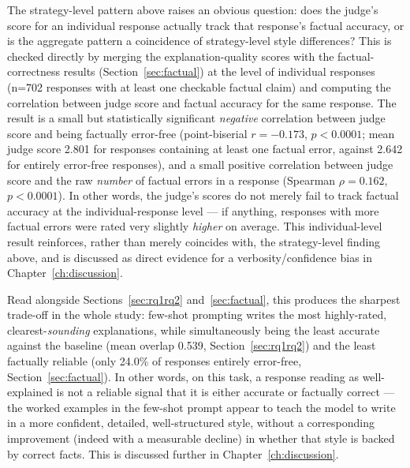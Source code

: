 The strategy-level pattern above raises an obvious question: does the judge's score for an individual response actually track that response's factual accuracy, or is the aggregate pattern a coincidence of strategy-level style differences? This is checked directly by merging the explanation-quality scores with the factual-correctness results (Section~\ref{sec:factual}) at the level of individual responses (n=702 responses with at least one checkable factual claim) and computing the correlation between judge score and factual accuracy for the same response. The result is a small but statistically significant \textit{negative} correlation between judge score and being factually error-free (point-biserial $r = -0.173$, $p < 0.0001$; mean judge score 2.801 for responses containing at least one factual error, against 2.642 for entirely error-free responses), and a small positive correlation between judge score and the raw \textit{number} of factual errors in a response (Spearman $\rho = 0.162$, $p < 0.0001$). In other words, the judge's scores do not merely fail to track factual accuracy at the individual-response level --- if anything, responses with more factual errors were rated very slightly \textit{higher} on average. This individual-level result reinforces, rather than merely coincides with, the strategy-level finding above, and is discussed as direct evidence for a verbosity/confidence bias in Chapter~\ref{ch:discussion}.

Read alongside Sections~\ref{sec:rq1rq2} and~\ref{sec:factual}, this produces the sharpest trade-off in the whole study: few-shot prompting writes the most highly-rated, clearest-\textit{sounding} explanations, while simultaneously being the least accurate against the baseline (mean overlap 0.539, Section~\ref{sec:rq1rq2}) and the least factually reliable (only 24.0\% of responses entirely error-free, Section~\ref{sec:factual}). In other words, on this task, a response reading as well-explained is not a reliable signal that it is either accurate or factually correct --- the worked examples in the few-shot prompt appear to teach the model to write in a more confident, detailed, well-structured style, without a corresponding improvement (indeed with a measurable decline) in whether that style is backed by correct facts. This is discussed further in Chapter~\ref{ch:discussion}.
